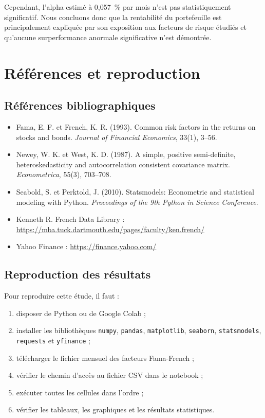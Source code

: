 \documentclass[12pt,a4paper]{article}
\begin{document}
Cependant, l'alpha estimé à 0,057~\% par mois n'est pas statistiquement significatif. Nous concluons donc que la rentabilité du portefeuille est principalement expliquée par son exposition aux facteurs de risque étudiés et qu'aucune surperformance anormale significative n'est démontrée.

\section{Références et reproduction}

\subsection*{Références bibliographiques}

\begin{itemize}
    \item Fama, E. F. et French, K. R. (1993). Common risk factors in the returns on stocks and bonds. \textit{Journal of Financial Economics}, 33(1), 3--56.
    \item Newey, W. K. et West, K. D. (1987). A simple, positive semi-definite, heteroskedasticity and autocorrelation consistent covariance matrix. \textit{Econometrica}, 55(3), 703--708.
    \item Seabold, S. et Perktold, J. (2010). Statsmodels: Econometric and statistical modeling with Python. \textit{Proceedings of the 9th Python in Science Conference}.
    \item Kenneth R. French Data Library : \url{https://mba.tuck.dartmouth.edu/pages/faculty/ken.french/}
    \item Yahoo Finance : \url{https://finance.yahoo.com/}
\end{itemize}

\subsection*{Reproduction des résultats}

Pour reproduire cette étude, il faut :
\begin{enumerate}
    \item disposer de Python ou de Google Colab ;
    \item installer les bibliothèques \texttt{numpy}, \texttt{pandas}, \texttt{matplotlib}, \texttt{seaborn}, \texttt{statsmodels}, \texttt{requests} et \texttt{yfinance} ;
    \item télécharger le fichier mensuel des facteurs Fama-French ;
    \item vérifier le chemin d'accès au fichier CSV dans le notebook ;
    \item exécuter toutes les cellules dans l'ordre ;
    \item vérifier les tableaux, les graphiques et les résultats statistiques.
\end{enumerate}
\end{document}
